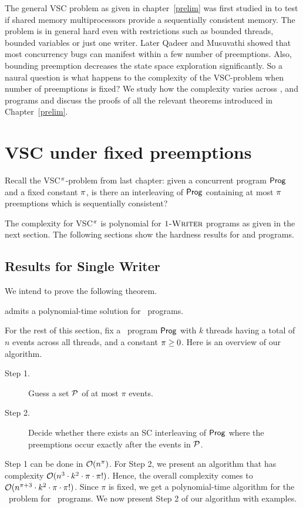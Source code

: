 The general VSC problem as given in chapter~\ref{prelim} was first studied in \cite{gibbons} to test if shared memory multiprocessors provide a sequentially consistent memory. The problem is in general hard even with restrictions such as bounded threads, bounded variables or just one writer. Later Qadeer and Musuvathi \cite{musuvathi} showed that most  concurrency bugs can manifest within a few number of  preemptions. Also, bounding preemption decreases the state space exploration significantly. So a naural question is what happens to the complexity of the VSC-problem when number of  preemptions is fixed?
We study how the complexity varies across \onewriter{}, \twowriter{} and \threewriter{} programs and discuss the proofs of all the relevant theorems introduced in Chapter~\ref{prelim}.

\section{VSC under fixed preemptions}\label{VSCp}

Recall the VSC$^\pi$-problem from last chapter: given a concurrent program $\mathsf{Prog}$ and a fixed constant $\pi$, is there an interleaving of $\mathsf{Prog}$ containing at most $\pi$ preemptions which is sequentially consistent? 

The complexity for VSC$^\pi$ is polynomial for $\textsc{1-Writer}$ programs as given in the next section. The following sections show the hardness results for \twowriter{} and \threewriter{} programs.

\subsection{Results for Single Writer}

We intend to prove the following theorem. 
\begin{theorem}\label{th:onewriter} \vscp  admits a polynomial-time solution for \onewriter\ programs.  
\end{theorem}

For the rest of this section, fix a \onewriter\ program $\mathsf{Prog}$ with $k$ threads having a total of $n$ events across all threads, 
and a constant $\pi \geq 0$. Here is an overview of our algorithm. 
\begin{description}
\item[Step 1.] Guess a set $\mathcal{P}$ of at most $\pi$ events.
\item[Step 2.] Decide whether there exists an SC interleaving of $\mathsf{Prog}$ where the preemptions occur exactly after the events in $\mathcal{P}$.
\end{description}
Step 1 can be done in $\mathcal{O}(n^{\pi})$.  For Step 2, we present an algorithm that has complexity $\mathcal{O}(n^3 \cdot k^2 \cdot \pi \cdot \pi!)$.  Hence, the overall complexity  comes to $\mathcal{O}(n^{\pi + 3} \cdot k^2 \cdot \pi \cdot \pi!)$. Since $\pi$ is fixed, we get a polynomial-time algorithm for the \vscp\ problem for \onewriter\ programs. We now present Step 2 of our algorithm with examples.  

